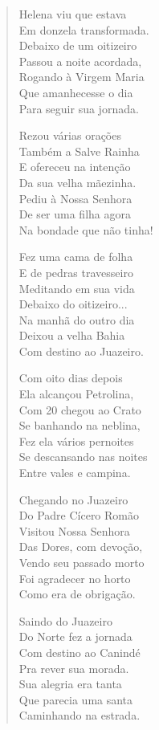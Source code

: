 \begin{verse}
Helena viu que estava \\
Em donzela transformada. \\
Debaixo de um oitizeiro \\
Passou a noite acordada, \\
Rogando à Virgem Maria \\
Que amanhecesse o dia \\
Para seguir sua jornada. 

Rezou várias orações \\
Também a Salve Rainha \\
E ofereceu na intenção \\
Da sua velha mãezinha. \\
Pediu à Nossa Senhora \\
De ser uma filha agora \\
Na bondade que não tinha! 

Fez uma cama de folha \\
E de pedras travesseiro \\
Meditando em sua vida \\
Debaixo do oitizeiro... \\
Na manhã do outro dia \\
Deixou a velha Bahia \\
Com destino ao Juazeiro. 


Com oito dias depois \\
Ela alcançou Petrolina, \\
Com 20 chegou ao Crato \\
Se banhando na neblina, \\
Fez ela vários pernoites \\
Se descansando nas noites \\
Entre vales e campina. 

Chegando no Juazeiro \\
Do Padre Cícero Romão \\
Visitou Nossa Senhora \\
Das Dores, com devoção, \\
Vendo seu passado morto \\
Foi agradecer no horto \\
Como era de obrigação. 

Saindo do Juazeiro \\
Do Norte fez a jornada \\
Com destino ao Canindé \\
Pra rever sua morada. \\
Sua alegria era tanta \\
Que parecia uma santa \\
Caminhando na estrada. 


\end{verse}
